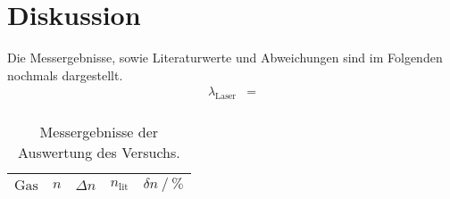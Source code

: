 \section{Diskussion}
\label{sec:Diskussion}
Die Messergebnisse, sowie Literaturwerte und Abweichungen sind im Folgenden nochmals dargestellt. \cite{Quelle1} \cite{Quelle2}
\begin{align*}
  \lambda_{\text{Laser}} &= \\
\end{align*}

\begin{table}
  \centering
  \caption{Messergebnisse der Auswertung des Versuchs.}
  \label{tab:irgendwas}
  \begin{tabular}{c c c c c}
    \toprule
    {$\text{Gas}$} & {$n$} & {$\Delta n$} & {$n_{\text{lit}}$} & {$\delta n \:/\: \si{\percent}$}\\
    \midrule
    
    \bottomrule
  \end{tabular}
\end{table}




